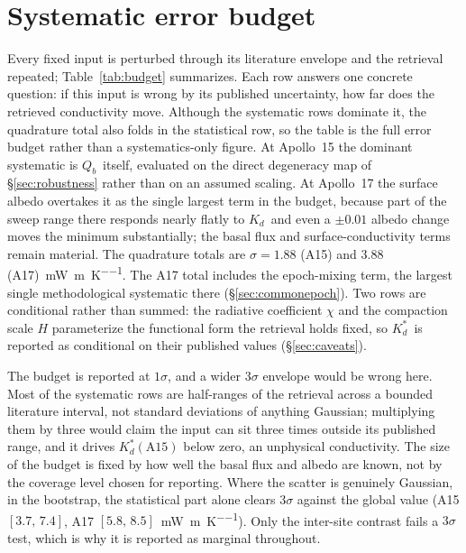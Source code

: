 \documentclass[11pt,a4paper,oneside]{report}
\newcommand{\Kd}{\ensuremath{K_d}}
\newcommand{\Kds}{\ensuremath{K_d^{*}}}
\newcommand{\Qb}{\ensuremath{Q_b}}
\newcommand{\mWmK}{\si{\milli\watt\per\meter\per\kelvin}}
\begin{document}
\section{Systematic error budget}\label{sec:budget}
Every fixed input is perturbed through its literature envelope and
the retrieval repeated; Table~\ref{tab:budget} summarizes. Each row
answers one concrete question: if this input is wrong by its published
uncertainty, how far does the retrieved conductivity move. Although
the systematic rows dominate it, the quadrature total also folds in
the statistical row, so the table is the full error budget rather
than a systematics-only figure. At
Apollo~15 the dominant systematic is \Qb\ itself, evaluated on the
direct degeneracy map of \S\ref{sec:robustness} rather than on an
assumed scaling. At Apollo~17 the surface albedo overtakes it as the
single largest term in the budget, because part of the sweep range
there responds nearly flatly to \Kd\ and even a $\pm0.01$ albedo
change moves the minimum substantially; the basal flux and
surface-conductivity terms remain material. The quadrature totals are
$\sigma=1.88$ (A15) and $3.88$ (A17)~\mWmK. The A17 total includes
the epoch-mixing term, the largest single methodological systematic
there (\S\ref{sec:commonepoch}). Two rows are conditional rather than
summed: the radiative coefficient $\chi$ and the compaction scale $H$
parameterize the functional form the retrieval holds fixed, so \Kds\
is reported as conditional on their published values
(\S\ref{sec:caveats}).

The budget is reported at $1\sigma$, and a wider $3\sigma$ envelope
would be wrong here. Most of the systematic rows are half-ranges of
the retrieval across a bounded literature interval, not standard
deviations of anything Gaussian; multiplying them by three would
claim the input can sit three times outside its published range, and
it drives $\Kds(\mathrm{A15})$ below zero, an unphysical
conductivity. The size of the budget is fixed by how well the basal
flux and albedo are known, not by the coverage level chosen for
reporting. Where the scatter is genuinely Gaussian, in the bootstrap,
the statistical part alone clears $3\sigma$ against the global value
(A15 $[3.7,\,7.4]$, A17 $[5.8,\,8.5]$~\mWmK). Only the inter-site
contrast fails a $3\sigma$ test, which is why it is reported as
marginal throughout.
\end{document}
